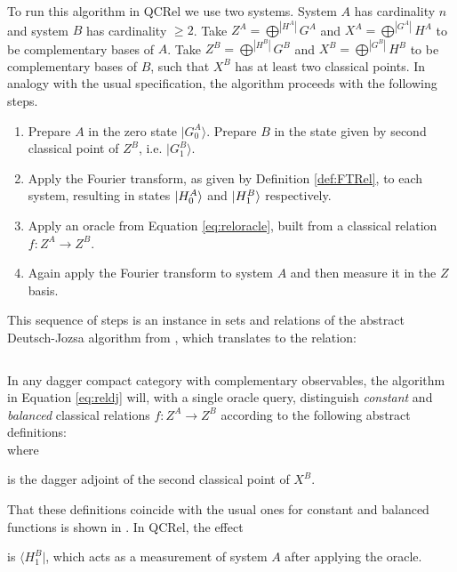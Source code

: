 To run this algorithm in QCRel we use two systems.  System $A$ has cardinality $n$ and system $B$ has cardinality $\ge 2$. Take $Z^A=\bigoplus^{|H^{A}|}G^A$ and $X^A=\bigoplus^{|G^{A}|}H^A$ to be complementary bases of $A$. Take $Z^B=\bigoplus^{|H^{B}|}G^B$ and $X^B=\bigoplus^{|G^{B}|}H^B$ to be complementary bases of $B$, such that $X^B$ has at least two classical points. In analogy with the usual specification, the algorithm proceeds with the following steps.
\begin{enumerate}
\item Prepare $A$ in the zero state $|G^{A}_0\rangle$. Prepare $B$ in the state given by second classical point of $Z^B$, i.e. $|G^B_1\rangle$.

\item Apply the Fourier transform, as given by Definition \ref{def:FTRel}, to each system, resulting in states $| H_0^A \rangle$ and $| H_1^B \rangle$ respectively.

\item Apply an oracle from Equation \ref{eq:reloracle}, built from a classical relation $f:Z^A\to Z^B$.

\item Again apply the Fourier transform to system $A$ and then measure it in the $Z$ basis.
\end{enumerate}

\noindent This sequence of steps is an instance in sets and relations of the abstract Deutsch-Jozsa algorithm from \cite{vicary-tqa}, which translates to the relation:


\begin{equation}
\label{eq:reldj}

\end{equation}

\begin{theorem}
\label{def:bc}
In any dagger compact category with complementary observables, the algorithm in Equation \ref{eq:reldj} will, with a single oracle query, distinguish \emph{constant} and \emph{balanced} classical relations $f:Z^A\to Z^B$ according to the following abstract definitions:
\begin{equation}

\end{equation}
where  is the dagger adjoint of the second classical point of $X^B$.
\end{theorem}
That these definitions coincide with the usual ones for constant and balanced functions is shown in \cite{vicary-tqa}. In QCRel, the effect  is $\langle H^B_1|$, which acts as a measurement of system $A$ after applying the oracle.

